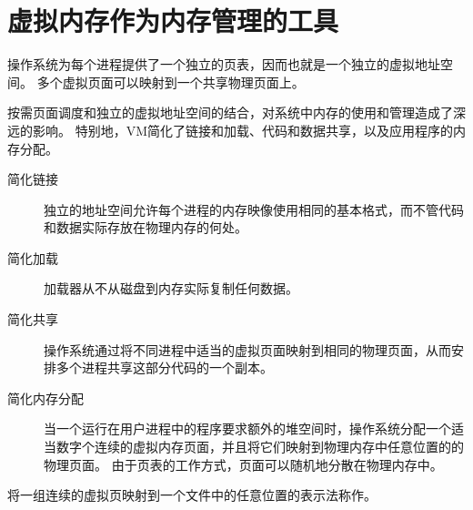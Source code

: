 
\section{虚拟内存作为内存管理的工具}
{
    操作系统为每个进程提供了一个独立的页表，因而也就是一个独立的虚拟地址空间。
    多个虚拟页面可以映射到一个共享物理页面上。

    按需页面调度和独立的虚拟地址空间的结合，对系统中内存的使用和管理造成了深远的影响。
    特别地，VM简化了链接和加载、代码和数据共享，以及应用程序的内存分配。

    \begin{description}
        \item[简化链接] 独立的地址空间允许每个进程的内存映像使用相同的基本格式，而不管代码和数据实际存放在物理内存的何处。
        \item[简化加载] 加载器从不从磁盘到内存实际复制任何数据。
        \item[简化共享] 操作系统通过将不同进程中适当的虚拟页面映射到相同的物理页面，从而安排多个进程共享这部分代码的一个副本。
        \item[简化内存分配]
        {
            当一个运行在用户进程中的程序要求额外的堆空间时，操作系统分配一个适当数字个连续的虚拟内存页面，并且将它们映射到物理内存中任意位置的的物理页面。
            由于页表的工作方式，页面可以随机地分散在物理内存中。
        }
    \end{description}

    将一组连续的虚拟页映射到一个文件中的任意位置的表示法称作。
}
